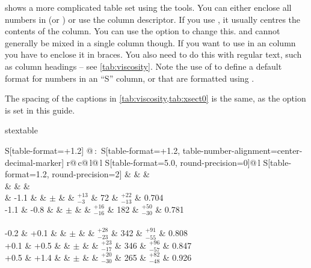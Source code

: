  shows a more complicated table set using the tools.
You can either enclose all numbers in  (or )
or use the  column descriptor.
If you use , it usually centres the contents of the column.
You can use the  option to change this.
 and  cannot generally be mixed in a single column though.
If you want to use  in an
 column you have to enclose it in braces.
You also need to do this with regular text,
such as column headings -- see \cref{tab:viscosity}.
Note the use of 
to define a default format for numbers in an \enquote{S} column,
or that are formatted using .

The spacing of the captions in \cref{tab:viscosity,tab:xsect0} is the same,
as the option  is set in this guide.

\begin{table}[htbp]
\begin{tcblisting}{stextable}
\caption{A selection of cross-section measurements!
  Typeset using the  macro.}%
\label{tab:xsect0}
\centering
\renewcommand{\arraystretch}{1.2}
\begin{tabular}{
    S[table-format=+1.2] @{\,:\,}
    S[table-format=+1.2, table-number-alignment=center-decimal-marker]
    r@{\,}c@{\,}l@{\,}l
    S[table-format=5.0, round-precision=0]@{\,}l
    S[table-format=1.2, round-precision=2]}
  \toprule
   &  
  &  & \Cbhad \\
   &  &
   & \\
   & -1.1 &  &
  \(\pm\) &  &
  \(^{+13}_{-3}\) &  72 & \(^{+22}_{-13}\) & 0.704 \\
  -1.1 & -0.8 &  &
  \(\pm\) &  &
  \(^{+16}_{-16}\) & 182 & \(^{+50}_{-30}\) & 0.781 \\
  \\
  -0.2 & +0.1 &  &
  \(\pm\) &  &
  \(^{+28}_{-23}\) & 342 & \(^{+91}_{-55}\) & 0.808 \\
  +0.1 & +0.5 &  &
  \(\pm\) &  &
  \(^{+23}_{-17}\) & 346 & \(^{+96}_{-57}\) & 0.847 \\
  +0.5 & +1.4 &  &
  \(\pm\) &  &
  \(^{+20}_{-30}\) & 265 & \(^{+82}_{-48}\) & 0.926 \\
  \bottomrule
\end{tabular}
\end{tcblisting}
\end{table}

